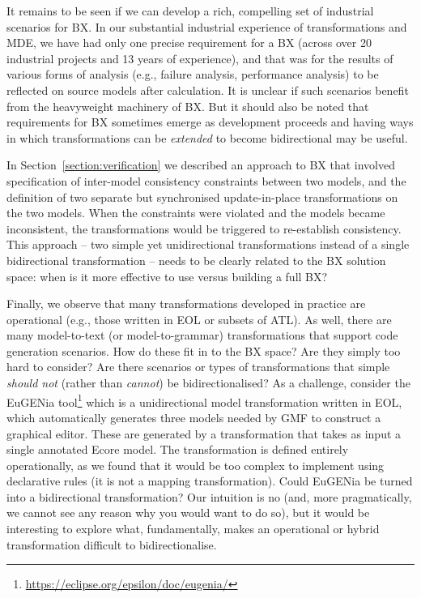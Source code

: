 It remains to be seen if we can develop a rich, compelling set of industrial scenarios for BX. In our substantial industrial experience of transformations and MDE, we have had only one precise requirement for a BX (across over 20 industrial projects and 13 years of experience), and that was for the results of various forms of analysis (e.g., failure analysis, performance analysis) to be reflected on source models after calculation. It is unclear if such scenarios benefit from the heavyweight machinery of BX. But it should also be noted that requirements for BX sometimes emerge as development proceeds and having ways in which transformations can be \textit{extended} to become bidirectional may be useful.

In Section~\ref{section:verification} we described an approach to BX that involved specification of inter-model consistency constraints between two models, and the definition of two separate but synchronised update-in-place transformations on the two models. When the constraints were violated and the models became inconsistent, the transformations would be triggered to re-establish consistency. This approach -- two simple yet unidirectional transformations instead of a single bidirectional transformation -- needs to be clearly related to the BX solution space: when is it more effective to use versus building a full BX?

Finally, we observe that many transformations developed in practice are operational (e.g., those written in EOL or subsets of ATL). As well, there are many model-to-text (or model-to-grammar) transformations that support code generation scenarios. How do these fit in to the BX space? Are they simply too hard to consider? Are there scenarios or types of transformations that simple \textit{should not} (rather than \textit{cannot}) be bidirectionalised? As a challenge, consider the EuGENia tool\footnote{\url{https://eclipse.org/epsilon/doc/eugenia/}} which is a unidirectional model transformation written in EOL, which automatically generates three models needed by GMF to construct a graphical editor. These are generated by a transformation that takes as input a single annotated Ecore model. The transformation is defined entirely operationally, as we found that it would be too complex to implement using declarative rules (it is not a mapping transformation). Could EuGENia be turned into a bidirectional transformation? Our intuition is no (and, more pragmatically, we cannot see any reason why you would want to do so), but it would be interesting to explore what, fundamentally, makes an operational or hybrid transformation difficult to bidirectionalise.

